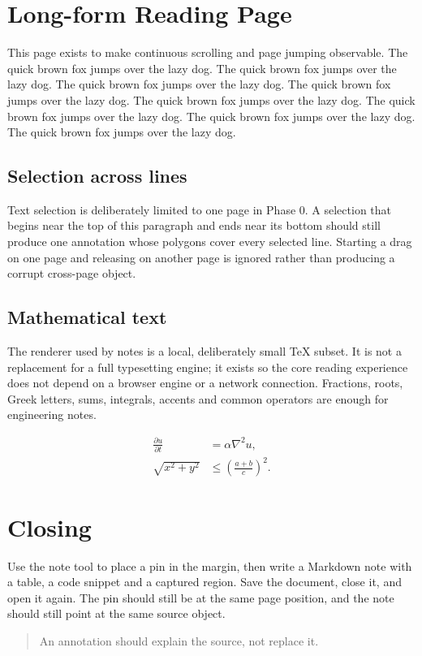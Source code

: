 \documentclass[11pt,a4paper]{article}
\begin{document}
\newpage
\section{Long-form Reading Page}
This page exists to make continuous scrolling and page jumping observable. The quick brown fox
jumps over the lazy dog. The quick brown fox jumps over the lazy dog. The quick brown fox jumps
over the lazy dog. The quick brown fox jumps over the lazy dog. The quick brown fox jumps over
the lazy dog. The quick brown fox jumps over the lazy dog. The quick brown fox jumps over the
lazy dog. The quick brown fox jumps over the lazy dog.

\subsection{Selection across lines}
Text selection is deliberately limited to one page in Phase 0. A selection that begins near the
top of this paragraph and ends near its bottom should still produce one annotation whose
polygons cover every selected line. Starting a drag on one page and releasing on another page is
ignored rather than producing a corrupt cross-page object.

\subsection{Mathematical text}
The renderer used by notes is a local, deliberately small TeX subset. It is not a replacement for
a full typesetting engine; it exists so the core reading experience does not depend on a browser
engine or a network connection. Fractions, roots, Greek letters, sums, integrals, accents and
common operators are enough for engineering notes.

\begin{align}
  \frac{\partial u}{\partial t} &= \alpha \nabla^2 u, \\
  \sqrt{x^2+y^2} &\le \left(\frac{a+b}{c}\right)^2.
\end{align}

\section{Closing}
Use the note tool to place a pin in the margin, then write a Markdown note with a table, a code
snippet and a captured region. Save the document, close it, and open it again. The pin should
still be at the same page position, and the note should still point at the same source object.

\begin{quote}
An annotation should explain the source, not replace it.
\end{quote}
\end{document}
